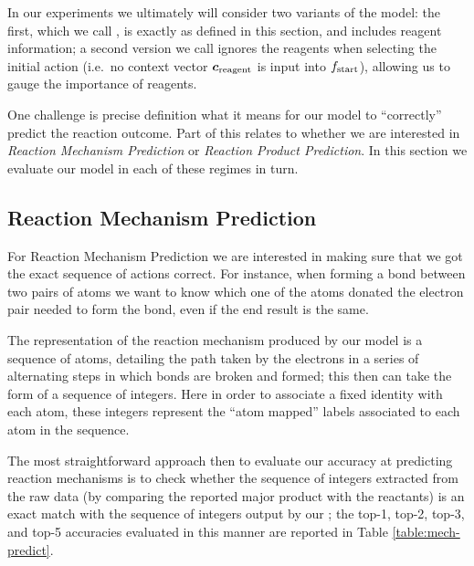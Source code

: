 

In our experiments we ultimately will consider two variants of the model: 
the first, which we call \ourModelR, is exactly as defined in this section, and includes reagent information;
a second version we call \ourModelIR ignores the reagents when selecting the initial action (i.e.\ no context vector $\bm{c}_\mathrm{reagent}$ is input into $f_{\textrm{start}}$), allowing us to gauge the importance of reagents.


One challenge is precise definition what it means for our model to ``correctly'' predict the reaction outcome. 
Part of this relates to whether we are interested in  \emph{Reaction Mechanism Prediction} or \emph{Reaction Product Prediction}.  
In this section we evaluate our model in each of these regimes in turn.

\subsection{Reaction Mechanism Prediction}

 For Reaction Mechanism Prediction we are interested in making sure that we got the exact sequence of actions correct.
For instance, when forming a bond between two pairs of atoms we want to know which one of the atoms donated the electron pair needed to form the bond, even if the end result is the same. 

The representation of the reaction mechanism produced by our model is a sequence of atoms, detailing the path taken by the electrons in a series of alternating steps in which bonds are broken and formed; this then can take the form of a sequence of integers.
Here in order to associate a fixed identity with each atom, these integers represent the ``atom mapped'' labels associated to each atom in the sequence.

The most straightforward approach then to evaluate our accuracy at predicting reaction mechanisms is to check whether the sequence of integers extracted from the raw data (by comparing the reported major product with the reactants) is an exact match with the sequence of integers output by our \ourModel; the top-1, top-2, top-3, and top-5 accuracies evaluated in this manner are reported in Table \ref{table:mech-predict}.

